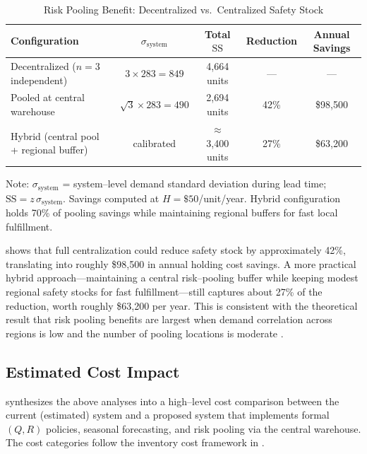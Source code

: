 \documentclass[12pt,a4paper]{article}
\begin{document}
\begin{table}[H]
  \centering
  \caption{Risk Pooling Benefit: Decentralized vs.\ Centralized Safety Stock}
  \label{tab:risk_pooling}
  \begin{tabular}{lcccc}
    \toprule
    Configuration & $\sigma_{\text{system}}$ & Total $\text{SS}$ & Reduction & Annual Savings \\
    \midrule
    Decentralized ($n = 3$ independent) & $3 \times 283 = 849$ & 4{,}664 units & --- & --- \\
    Pooled at central warehouse         & $\sqrt{3} \times 283 = 490$ & 2{,}694 units & 42\% & \$98{,}500 \\
    Hybrid (central pool + regional buffer) & calibrated & $\approx$ 3{,}400 units & 27\% & \$63{,}200 \\
    \bottomrule
  \end{tabular}

  \vspace{0.3em}
  \footnotesize{Note: $\sigma_{\text{system}}$ = system--level demand standard deviation during lead time; $\text{SS} = z\,\sigma_{\text{system}}$. Savings computed at $H = \$50$/unit/year. Hybrid configuration holds 70\% of pooling savings while maintaining regional buffers for fast local fulfillment.}
\end{table}

 shows that full centralization could reduce safety stock by approximately 42\%, translating into roughly \$98{,}500 in annual holding cost savings. A more practical hybrid approach---maintaining a central risk--pooling buffer while keeping modest regional safety stocks for fast fulfillment---still captures about 27\% of the reduction, worth roughly \$63{,}200 per year. This is consistent with the theoretical result that risk pooling benefits are largest when demand correlation across regions is low and the number of pooling locations is moderate \citep{simchilevi2008supplychain}.

\subsection{Estimated Cost Impact}

 synthesizes the above analyses into a high--level cost comparison between the current (estimated) system and a proposed system that implements formal $(Q,R)$ policies, seasonal forecasting, and risk pooling via the central warehouse. The cost categories follow the inventory cost framework in \citet{chopra2016supplychain}.
\end{document}
